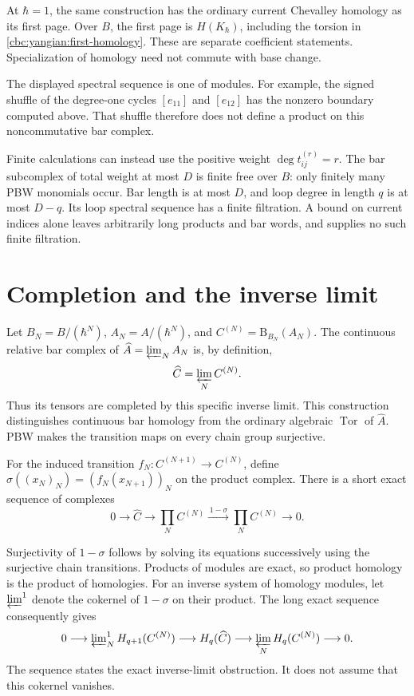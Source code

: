 At $\hbar=1$, the same construction has the ordinary current
Chevalley homology as its first page.  Over $B$, the first page is
$H(K_\hbar)$, including the torsion in
\eqref{cbc:yangian:first-homology}.  These are separate coefficient
statements.  Specialization of homology need not commute with base change.

The displayed spectral sequence is one of modules.  For example, the
signed shuffle of the degree-one cycles $[e_{11}]$ and $[e_{12}]$
has the nonzero boundary computed above.  That shuffle therefore does
not define a product on this noncommutative bar complex.

Finite calculations can instead use the positive weight
$\deg t_{ij}^{(r)}=r$.  The bar subcomplex of total weight at most $D$
is finite free over $B$: only finitely many PBW monomials occur.
Bar length is at most $D$, and loop degree in length $q$ is at most $D-q$.
Its loop spectral sequence has a finite filtration.
A bound on current indices alone leaves arbitrarily long products
and bar words, and supplies no such finite filtration.

\section{Completion and the inverse limit}

Let $B_N=B/(\hbar^N)$, $A_N=A/(\hbar^N)$, and
$C^{(N)}=\mathrm B_{B_N}(A_N)$.  The continuous relative bar complex
of $\widehat A=\varprojlim_N A_N$ is, by definition,
\[
 \widehat C=\varprojlim_N C^{(N)}.
\]
Thus its tensors are completed by this specific inverse limit.
This construction distinguishes continuous bar homology from the
ordinary algebraic $\operatorname{Tor}$ of $\widehat A$.
PBW makes the transition maps on every chain group surjective.

For the induced transition $f_N:C^{(N+1)}\to C^{(N)}$, define
$\sigma((x_N)_N)=(f_N(x_{N+1}))_N$ on the product complex.
There is a short exact sequence of complexes
\[
 0\longrightarrow\widehat C\longrightarrow\prod_N C^{(N)}
\xrightarrow{\,1-\sigma\,}\prod_N C^{(N)}\longrightarrow0.
\]

Surjectivity of $1-\sigma$ follows by solving its equations successively
using the surjective chain transitions.  Products of modules are exact,
so product homology is the product of homologies.
For an inverse system of homology modules, let $\varprojlim^1$ denote
the cokernel of $1-\sigma$ on their product.
The long exact sequence consequently gives
\begin{equation}\label{cbc:yangian:milnor}
 0\longrightarrow\varprojlim\nolimits_N^1 H_{q+1}(C^{(N)})
 \longrightarrow H_q(\widehat C)
 \longrightarrow\varprojlim_N H_q(C^{(N)})\longrightarrow0.
\end{equation}
The sequence states the exact inverse-limit obstruction.
It does not assume that this cokernel vanishes.

